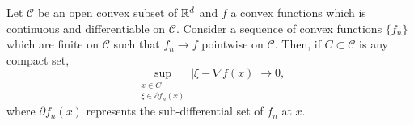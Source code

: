 \begin{lemma}\label{sebo}
Let $\mathcal{C}$ be an open convex subset of  $\mathbb{R}^d$ and $f$ a convex functions which is continuous and differentiable on $\mathcal{C}$. Consider a sequence of convex functions $\{f_n\}$ which are finite on $\mathcal{C}$ such that $f_n\to f$ pointwise on $\mathcal{C}$. Then, if $C\subset\mathcal{C}$ is any compact set,
\[
\sup_{\substack{x\in C\\\xi\in\partial f_n(x)}}|\xi - \nabla f(x)|\to 0,
\]
where $\partial f_n(x)$ represents the sub-differential set of $f_n$ at $x$. \qedhere
\end{lemma}
